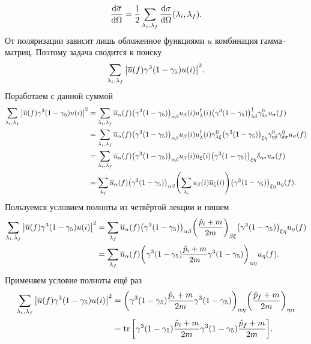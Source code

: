 \documentclass[12pt]{article}
\begin{document}
	\begin{equation}
		\dv{\overline{\sigma}}{\Omega} = \dfrac12 \sum\limits_{\lambda_i, \lambda_f} \dv{\sigma}{\Omega} \qty(\lambda_i, \lambda_f).
	\end{equation}
	От поляризации зависит лишь обложенное функциями $u$ комбинация гамма\---матриц. Поэтому задача сводится к поиску 
	$$\sum\limits_{\lambda_i, \lambda_f} \abs{\overline{u}(f)\gamma^3(1-\gamma_5)u(i)}^2.$$
	Поработаем с данной суммой
	\begin{equation*}
		\begin{split}
			\sum\limits_{\lambda_i, \lambda_f} \abs{\overline{u}(f)\gamma^3(1-\gamma_5)u(i)}^2 &= \sum\limits_{\lambda_i, \lambda_f} \overline{u}_\alpha(f) \qty(\gamma^3(1-\gamma_5))_{\alpha\beta} u_\beta(i)u^\dag_\lambda(i) \qty(\gamma^3(1-\gamma_5))^\dag_{\lambda\delta}\gamma^0_{\delta\sigma}u_\sigma(f)\\
			&= \sum\limits_{\lambda_i, \lambda_f} \overline{u}_\alpha(f) \qty(\gamma^3(1-\gamma_5))_{\alpha\beta} u_\beta(i)u^\dag_\lambda(i) \gamma^0_{\lambda\xi} \qty(\gamma^3(1-\gamma_5))_{\xi\eta} \gamma^0_{\eta\delta} \gamma^0_{\delta\sigma}u_\sigma(f)\\
			&=\sum\limits_{\lambda_i, \lambda_f} \overline{u}_\alpha(f) \qty(\gamma^3(1-\gamma_5))_{\alpha\beta} u_\beta(i) \overline{u}_\xi(i) \qty(\gamma^3(1-\gamma_5))_{\xi\eta} \delta_{\eta \sigma} u_\sigma(f)\\
			&= \sum\limits_{\lambda_f}\overline{u}_\alpha(f) \qty(\gamma^3(1-\gamma_5))_{\alpha\beta} \qty(\sum\limits_{\lambda_i} u_\beta(i) \overline{u}_\xi(i)) \qty(\gamma^3(1-\gamma_5))_{\xi\eta} u_\eta(f).
		\end{split}
	\end{equation*}
	Пользуемся условием полноты из четвёртой лекции и пишем
	\begin{equation*}
		\begin{split}
			\sum\limits_{\lambda_i, \lambda_f} \abs{\overline{u}(f)\gamma^3(1-\gamma_5)u(i)}^2 &= \sum\limits_{\lambda_f}\overline{u}_\alpha(f) \qty(\gamma^3(1-\gamma_5))_{\alpha\beta} \qty(\dfrac{\hat{p}_i+m}{2m})_{\beta\xi} \qty(\gamma^3(1-\gamma_5))_{\xi\eta} u_\eta(f)\\
			&= \sum\limits_{\lambda_f}\overline{u}_\alpha(f) \qty(\gamma^3(1-\gamma_5)\dfrac{\hat{p}_i+m}{2m}\gamma^3(1-\gamma_5))_{\alpha\eta} u_\eta(f).
		\end{split}
	\end{equation*}
	Применяем условие полноты ещё раз
	\begin{equation*}
		\begin{split}
			\sum\limits_{\lambda_i, \lambda_f} \abs{\overline{u}(f)\gamma^3(1-\gamma_5)u(i)}^2 &= \qty(\gamma^3(1-\gamma_5)\dfrac{\hat{p}_i+m}{2m}\gamma^3(1-\gamma_5))_{\alpha\eta} \qty(\dfrac{\hat{p}_f+m}{2m})_{\eta\alpha}\\
			&=\tr\qty[\gamma^3(1-\gamma_5)\dfrac{\hat{p}_i+m}{2m}\gamma^3(1-\gamma_5)\dfrac{\hat{p}_f+m}{2m}].
		\end{split}
	\end{equation*}
\end{document}
